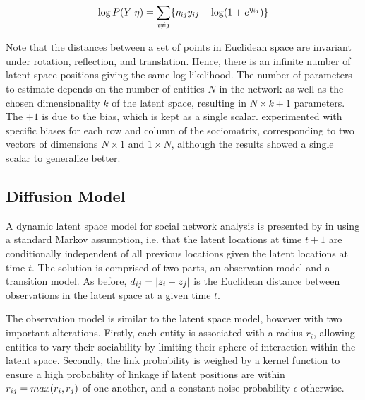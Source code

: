         \begin{equation}\label{eq:lsm-log-likelihood}
            \log P(Y|\eta) = \sum_{i\neq j}\{ \sub(\eta)\sub(y) - \log(1+e^{\sub(\eta)}) \}
        \end{equation}
        
        Note that the distances between a set of points in Euclidean space are invariant under rotation, reflection, and translation. Hence, there is an infinite number of latent space positions giving the same log-likelihood. The number of parameters to estimate depends on the number of entities $N$ in the network as well as the chosen dimensionality $k$ of the latent space, resulting in $N \times k + 1$ parameters. The $+1$ is due to the bias, which is kept as a single scalar. \citeauthor{jacobsen2018a} experimented with specific biases for each row and column of the sociomatrix, corresponding to two vectors of dimensions $N\times 1$ and $1\times N$, although the results showed a single scalar to generalize better.
        
        
        
    \subsection{Diffusion Model}
        
        A dynamic latent space model for social network analysis is presented by \citeauthor{sarkar2005dynamic} in \cite{sarkar2005dynamic} using a standard Markov assumption, i.e. that the latent locations at time $t+1$ are conditionally independent of all previous locations given the latent locations at time $t$. The solution is comprised of two parts, an observation model and a transition model. As before, $\sub(d)=|z_i-z_j|$ is the Euclidean distance between observations in the latent space at a given time $t$.
        
        The observation model is similar to the latent space model, however with two important alterations. Firstly, each entity is associated with a radius $r_i$, allowing entities to vary their sociability by limiting their sphere of interaction within the latent space.
        Secondly, the link probability is weighed by a kernel function to ensure a high probability of linkage if latent positions are within $\sub(r)=max(r_i,r_j)$ of one another, and a constant noise probability $\epsilon$ otherwise.
        
